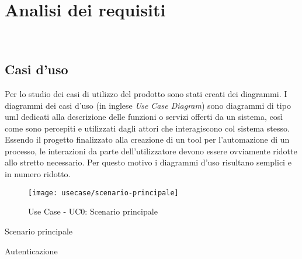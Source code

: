 
\chapter{Analisi dei requisiti}
\label{cap:analisi-requisiti}

\\

\section{Casi d'uso}

Per lo studio dei casi di utilizzo del prodotto sono stati creati dei diagrammi.
I diagrammi dei casi d'uso (in inglese \emph{Use Case Diagram}) sono diagrammi di tipo \gls{uml} dedicati alla descrizione delle funzioni o servizi offerti da un sistema, così come sono percepiti e utilizzati dagli attori che interagiscono col sistema stesso.
Essendo il progetto finalizzato alla creazione di un tool per l'automazione di un processo, le interazioni da parte dell'utilizzatore devono essere ovviamente ridotte allo stretto necessario. Per questo motivo i diagrammi d'uso risultano semplici e in numero ridotto.

\begin{figure}[!h]
  \centering
  \texttt{[image: usecase/scenario-principale]}
  \caption{Use Case - UC0: Scenario principale}
\end{figure}

\begin{usecase}{0}{Scenario principale}
  \label{uc:scenario-principale}
\end{usecase}

\begin{usecase}{1}{Autenticazione}
  \label{uc:autenticazione}
\end{usecase}

